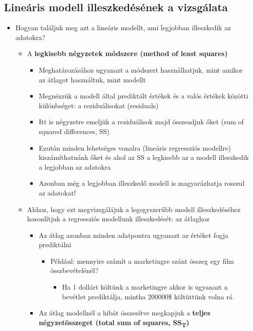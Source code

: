 \documentclass[
  letterpaper,
  DIV=11,
  numbers=noendperiod]{scrreprt}
\providecommand{\tightlist}{%
  \setlength{\itemsep}{0pt}\setlength{\parskip}{0pt}}\usepackage{longtable,booktabs,array}
\begin{document}
\hypertarget{lineuxe1ris-modell-illeszkeduxe9suxe9nek-a-vizsguxe1lata}{%
\subsection{Lineáris modell illeszkedésének a
vizsgálata}\label{lineuxe1ris-modell-illeszkeduxe9suxe9nek-a-vizsguxe1lata}}

\begin{itemize}
\item
  Hogyan találjuk meg azt a lineáris modellt, ami legjobban illeszkedik
  az adatokra?

  \begin{itemize}
  \item
    A \textbf{legkisebb négyzetek módszere (method of least squares)}

    \begin{itemize}
    \item
      Meghatározásához ugyanazt a módszert használhatjuk, mint amikor az
      átlagot használtuk, mint modellt
    \item
      Megnézzük a modell által prediktált értékek és a valós értékek
      közötti különbséget: a reziduálisokat (residuals)
    \item
      Itt is négyzetre emeljük a reziduálisok majd összeadjuk őket (sum
      of squared differences, SS)
    \item
      Ezután minden lehetséges vonalra (lineáris regressziós modellre)
      kiszámíthatnánk őket és ahol az SS a legkisebb az a modell
      illeszkedik a legjobban az adatokra
    \item
      Azonban még a legjobban illeszkedő modell is magyarázhatja rosszul
      az adatokat!
    \end{itemize}
  \item
    Ahhoz, hogy ezt megvizsgálájuk a legegyszerűbb modell
    illeszkedéséhez hasonlítjuk a regressziós modellunk illeszkedését:
    az átlaghoz

    \begin{itemize}
    \item
      Az átlag azonban minden adatpontra ugyanazt az értéket fogja
      prediktálni

      \begin{itemize}
      \item
        Például: mennyire számít a marketingre szánt összeg egy film
        összbevételénél?

        \begin{itemize}
        \tightlist
        \item
          Ha 1 dollárt költünk a marketingre akkor is ugyanazt a
          bevétlet prediktálja, mintha 200000\$ költüttünk volna rá
        \end{itemize}
      \end{itemize}
    \item
      Az átlag modellnél a hibát összesítve megkapjuk a \textbf{teljes
      négyzetösszeget (total sum of squares, SS\textsubscript{T})}


\end{itemize}
\end{itemize}
\end{itemize}
\end{document}
